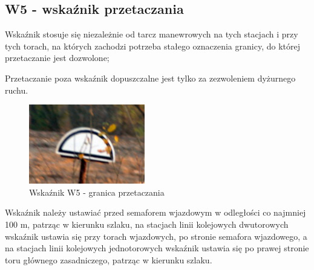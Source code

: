 \subsection{W5 - wskaźnik przetaczania}
\begin{tcolorbox}[colback=black!5!white,colframe=white!55!black,title=Wskaźnik W5]
Wskaźnik stosuje się niezależnie od tarcz manewrowych na tych stacjach i przy tych torach, na których zachodzi potrzeba stałego oznaczenia granicy, do której przetaczanie jest dozwolone;
\end{tcolorbox} Przetaczanie poza wskaźnik dopuszczalne jest tylko za zezwoleniem dyżurnego ruchu. 
	\begin{figure}
	\includegraphics[width=0.45\textwidth]{skryptkierownik-img/skryptkierownik-img009.jpg}
	\caption{Wskaźnik W5 - granica przetaczania}
\end{figure}
Wskaźnik należy ustawiać przed semaforem wjazdowym w odległości co najmniej 100 m, patrząc w kierunku szlaku, na stacjach linii kolejowych dwutorowych wskaźnik ustawia się przy torach wjazdowych, po stronie semafora wjazdowego, a na stacjach linii kolejowych jednotorowych wskaźnik ustawia się po prawej stronie toru głównego zasadniczego, patrząc w kierunku szlaku.


